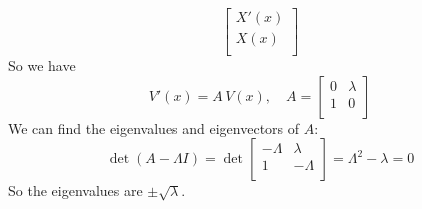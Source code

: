 \documentclass[plain]{pset}
\begin{document}
\begin{solution}
\[\begin{bmatrix}
            X'(x) \\
            X(x)  \\
        \end{bmatrix}
    \]
    So we have
    \[V'(x) = A\,V(x), \quad A = \begin{bmatrix}
            0 & \lambda \\
            1 & 0       \\
        \end{bmatrix}\]
    We can find the eigenvalues and eigenvectors of \(A\):
    \[\det(A - \Lambda I) = \det\begin{bmatrix}
            -\Lambda & \lambda  \\
            1        & -\Lambda \\
        \end{bmatrix} = \Lambda^2 - \lambda = 0\]
    So the eigenvalues are \(\pm\sqrt{\lambda}\).


\end{solution}
\end{document}
